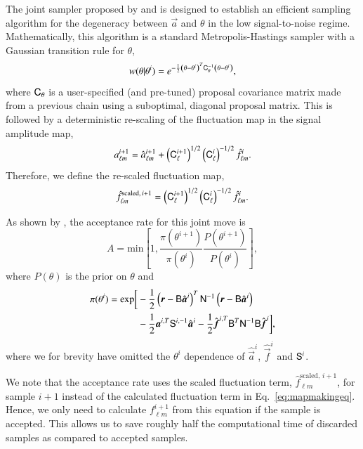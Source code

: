 \documentclass[twocolumn]{../common/aa}
\newcommand{\B}[0]{\tens{B}}
\renewcommand{\C}[0]{\tens{C}}
\renewcommand{\a}[0]{\vec{a}}
\newcommand{\f}[0]{\vec{f}}
\newcommand{\N}[0]{\tens{N}}
\renewcommand{\S}[0]{\tens{S}}
\renewcommand{\r}[0]{\vec{r}}
\begin{document}
The joint sampler proposed by \citet{jewell:2009} and \citet{racine:2016} is designed to establish an efficient sampling algorithm for the degeneracy between $\a$ and $\theta$ in the low signal-to-noise regime. Mathematically, this algorithm is a standard Metropolis-Hastings sampler with a Gaussian transition rule for $\theta$,
\begin{equation}
w(\theta |\theta^i) = e^{-\frac12 \left(\theta - \theta^i \right)^T \C_{\theta}^{-1}\left(\theta - \theta^i \right)},
\end{equation}
where $\C_{\theta}$ is a user-specified (and pre-tuned) proposal covariance matrix made from a previous chain using a suboptimal, diagonal proposal matrix. This is followed by a deterministic re-scaling of the fluctuation map in the signal amplitude map,
\begin{equation}
    a_{\ell m}^{i+1} = \hat{a}_{\ell m}^{i+1} + \left(\C^{i+1}_{\ell}\right)^{1/2}\left(\C^{i}_{\ell}\right)^{-1/2} \hat{f}_{\ell m}^{i}.
\end{equation}
Therefore, we define the re-scaled fluctuation map,
\begin{equation}
  \hat{f}_{\ell m}^{\textrm{scaled},\, i+1} = \left(\C^{i+1}_{\ell}\right)^{1/2}\left(\C^{i}_{\ell}\right)^{-1/2} \hat{f}_{\ell m}^{i}.
\end{equation}

As shown by \citet{racine:2016}, the acceptance rate for this joint move is
\begin{equation}
    \label{eq:acceptance-rate}
    A = \mathrm{min}\left[1, \frac{\pi(\theta^{i+1})}{\pi(\theta^i)} \frac{P(\theta^{i+1})}{P(\theta^i)} \right],
\end{equation}
where $P(\theta)$ is the prior on $\theta$ and
\begin{align}
    \nonumber
    \pi(\theta^{i}) = \mathrm{exp}\bigg[&-\frac12 \left(\r-\B\hat{\a}^i\right)^T \N^{-1}\left(\r-\B\hat{\a}^i\right)\\
    &-\frac12\a^{i,T} \S^{i, -1}\hat{\a}^i -\frac12 \hat{\f}^{i, T}\B^T\N^{-1} \B\hat{\f}^i\bigg],
\end{align}
where we for brevity have omitted the $\theta^i$ dependence of $\hat{\a}^i$, $\hat{\f}^i$ and $\S^i$. 

We note that the acceptance rate uses the scaled fluctuation term, $\hat{f}_{\ell m}^{\textrm{scaled},\, i+1}$, for sample $i+1$ instead of the calculated fluctuation term in Eq.~\eqref{eq:mapmakingeq}. Hence, we only need to calculate $f_{\ell m}^{i+1}$ from this equation if the sample is accepted. This allows us to save roughly half the computational time of discarded samples as compared to accepted samples.
\end{document}
